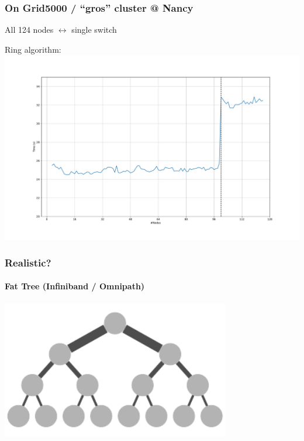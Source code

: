 \documentclass[xcolor={rgb,x11names,svgnames},rgb,x11names,svgnames]{beamer}
\begin{document}
\begin{frame}
  \frametitle{On Grid5000 / ``gros'' cluster @ Nancy}
  All 124 nodes $\leftrightarrow$ single switch

  Ring algorithm:
  \includegraphics[width=\textwidth]{gros_cyclic.pdf}
\end{frame}


\begin{frame}
  \frametitle{Realistic?}
  \framesubtitle{Fat Tree (Infiniband / Omnipath)}

  \centering
  \includegraphics[width=10cm]{fat_tree.pdf}
\end{frame}

\end{document}
